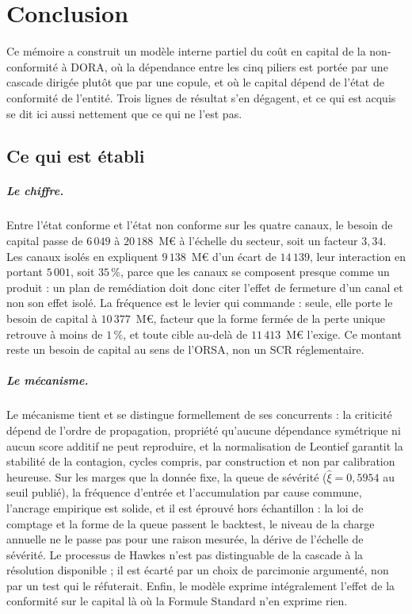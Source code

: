 \chapter{Conclusion}

Ce mémoire a construit un modèle interne partiel du coût en capital de la non-conformité à
DORA, où la dépendance entre les cinq piliers est portée par une cascade dirigée plutôt que
par une copule, et où le capital dépend de l'état de conformité de l'entité. Trois lignes de
résultat s'en dégagent, et ce qui est acquis se dit ici aussi nettement que ce qui
ne l'est pas.

\section{Ce qui est établi}
\paragraph{Le chiffre.} Entre l'état conforme et l'état non conforme sur les quatre canaux, le
besoin de capital passe de $6\,049$ à $20\,188$~M\euro{} à l'échelle du secteur, soit un facteur
$3{,}34$. Les canaux isolés en expliquent $9\,138$~M\euro{} d'un écart de $14\,139$, leur
interaction en portant $5\,001$, soit
$35\,\%$, parce que les canaux se composent presque comme un produit : un plan de
remédiation doit donc citer l'effet de fermeture d'un canal et non son effet isolé. La fréquence
est le levier qui commande : seule, elle porte le besoin de capital à $10\,377$~M\euro{}, facteur
que la forme fermée de la perte unique retrouve à moins de $1\,\%$, et toute cible au-delà de
$11\,413$~M\euro{} l'exige. Ce montant
reste un besoin de capital au sens de l'ORSA, non un SCR réglementaire.

\paragraph{Le mécanisme.} Le mécanisme tient et se distingue formellement de ses concurrents : la criticité dépend de
l'ordre de propagation, propriété qu'aucune dépendance symétrique ni aucun score
additif ne peut reproduire, et la normalisation de Leontief garantit la stabilité de la
contagion, cycles compris, par construction et non par calibration heureuse. Sur les marges
que la donnée fixe, la queue de sévérité ($\hat\xi = 0{,}5954$ au seuil publié), la
fréquence d'entrée et l'accumulation par cause commune, l'ancrage empirique est solide, et il est
éprouvé hors échantillon : la loi de comptage et la forme de la queue passent le backtest, le
niveau de la charge annuelle ne le passe pas pour une raison mesurée, la dérive de l'échelle de
sévérité. Le processus de Hawkes n'est pas distinguable de la cascade à la résolution
disponible ; il est écarté par un choix de parcimonie argumenté, non par un test qui le
réfuterait. Enfin, le modèle exprime intégralement l'effet de la
conformité sur le capital là où la Formule Standard n'en exprime rien.

